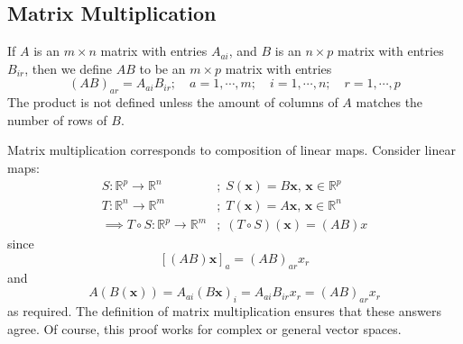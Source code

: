 \documentclass{article}
\begin{document}
\subsection{Matrix Multiplication}
If $A$ is an $m\times n$ matrix with entries $A_{ai}$, and $B$ is an $n \times p$ matrix with entries $B_{ir}$, then we define $AB$ to be an $m \times p$ matrix with entries
\[ (AB)_{ar} = A_{ai}B_{ir};\quad a = 1, \cdots, m;\quad i = 1, \cdots, n;\quad r = 1, \cdots, p \]
The product is not defined unless the amount of columns of $A$ matches the number of rows of $B$.

Matrix multiplication corresponds to composition of linear maps. Consider linear maps:
\begin{align*}
	S: \mathbb R^p \to \mathbb R^n                  & ;\; S(\bm x) = B \bm x,\, \bm x \in \mathbb R^p \\
	T: \mathbb R^n \to \mathbb R^m                  & ;\; T(\bm x) = A \bm x,\, \bm x \in \mathbb R^n \\
	\implies T \circ S: \mathbb R^p \to \mathbb R^m & ;\; (T\circ S)(\bm x) = (AB)x
\end{align*}
since
\[ \left[ (AB)\bm x \right]_a = (AB)_{ar}x_r \]
and
\[ A(B(\bm x)) = A_{ai} (B\bm x)_i = A_{ai} B_{ir} x_r = (AB)_{ar}x_r \]
as required. The definition of matrix multiplication ensures that these answers agree. Of course, this proof works for complex or general vector spaces.
\end{document}
